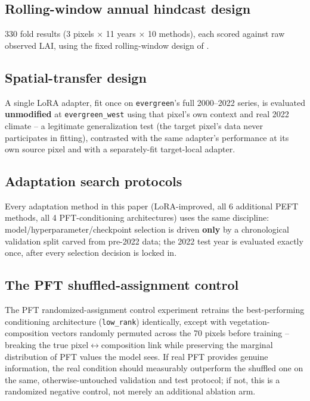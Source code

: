 \documentclass[11pt]{article}
\begin{document}
\subsection{Rolling-window annual hindcast design}
\label{sec:expdesign-loyo}

330 fold results (3 pixels $\times$ 11 years $\times$ 10 methods), each scored against raw
observed LAI, using the fixed rolling-window design of .

\subsection{Spatial-transfer design}
\label{sec:expdesign-spatial}

A single LoRA adapter, fit once on \texttt{evergreen}'s full 2000--2022 series, is evaluated
\textbf{unmodified} at \texttt{evergreen\_west} using that pixel's own context and real 2022
climate -- a legitimate generalization test (the target pixel's data never participates in
fitting), contrasted with the same adapter's performance at its own source pixel and with a
separately-fit target-local adapter.

\subsection{Adaptation search protocols}
\label{sec:expdesign-search}

Every adaptation method in this paper (LoRA-improved, all 6 additional PEFT methods, all 4
PFT-conditioning architectures) uses the same discipline: model/hyperparameter/checkpoint
selection is driven \textbf{only} by a chronological validation split carved from pre-2022 data;
the 2022 test year is evaluated exactly once, after every selection decision is locked in.

\subsection{The PFT shuffled-assignment control}
\label{sec:expdesign-shuffle}

The PFT randomized-assignment control experiment retrains the best-performing conditioning architecture
(\texttt{low\_rank}) identically, except with vegetation-composition vectors randomly permuted
across the 70 pixels before training -- breaking the true pixel$\leftrightarrow$composition link
while preserving the marginal distribution of PFT values the model sees. If real PFT provides
genuine information, the real condition should measurably outperform the shuffled one on the
same, otherwise-untouched validation and test protocol; if not, this is a randomized negative
control, not merely an additional ablation arm.
\end{document}
